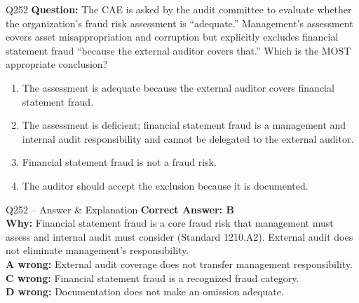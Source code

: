 \documentclass[aspectratio=169,10pt]{beamer}
\begin{document}
	\begin{frame}[t]{Q252}
		\small
		\textbf{Question:} The CAE is asked by the audit committee to evaluate whether the organization's fraud risk assessment is ``adequate.'' Management's assessment covers asset misappropriation and corruption but explicitly excludes financial statement fraud ``because the external auditor covers that.'' Which is the MOST appropriate conclusion?
		\begin{enumerate}[label=\Alph*.,itemsep=1pt,topsep=2pt]
			\item The assessment is adequate because the external auditor covers financial statement fraud.
			\item The assessment is deficient; financial statement fraud is a management and internal audit responsibility and cannot be delegated to the external auditor.
			\item Financial statement fraud is not a fraud risk.
			\item The auditor should accept the exclusion because it is documented.
		\end{enumerate}
	\end{frame}
	
	\begin{frame}[t]{Q252 -- Answer \& Explanation}
		\small
		\textbf{Correct Answer: B} \\[4pt]
		\textbf{Why:} Financial statement fraud is a core fraud risk that management must assess and internal audit must consider (Standard 1210.A2). External audit does not eliminate management's responsibility. \\[4pt]
		\textbf{A wrong:} External audit coverage does not transfer management responsibility. \\[2pt]
		\textbf{C wrong:} Financial statement fraud is a recognized fraud category. \\[2pt]
		\textbf{D wrong:} Documentation does not make an omission adequate.
	\end{frame}
	
\end{document}
